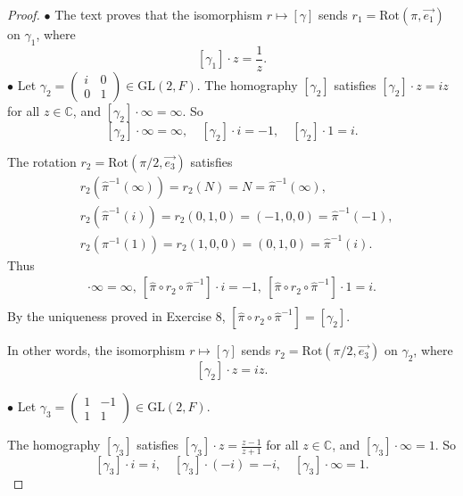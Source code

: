 \documentclass[11pt,a4paper]{article}
\newcommand{\C}{\mathbb{C}}
\begin{document}
\begin{proof}
$\bullet$ The text proves that the isomorphism $r\mapsto [\gamma]$ sends $r_1 = \mathrm{Rot}(\pi, \overrightarrow{e_1})$ on $\gamma_1$, where $$[\gamma_1]\cdot z = \frac{1}{z}.$$
$\bullet$ Let
$\gamma_2 =
\left(
\begin{array}{cc}
 i&   0   \\
 0&   1  
\end{array}
\right) 
\in \mathrm{GL}(2,F)
$. The homography $[\gamma_2]$ satisfies $[\gamma_2]\cdot z = iz$ for all $z\in \C$, and $[\gamma_2] \cdot \infty = \infty$. So $$[\gamma_2] \cdot \infty = \infty,\quad[\gamma_2]\cdot i = -1, \quad[\gamma_2]\cdot 1 = i.$$

The rotation $r_2 = \mathrm{Rot}(\pi/2, \overrightarrow{e_3})$ satisfies
\begin{align*}
&r_2(\hat{\pi}^{-1}(\infty))  = r_2(N) = N = \hat{\pi}^{-1}(\infty), \\
&r_2(\hat{\pi}^{-1}(i)) =r_2(0,1,0) = (-1,0,0) = \hat{\pi}^{-1}(-1),\\
 &r_2(\pi^{-1}(1))=r_2(1,0,0) = (0,1,0) = \hat{\pi}^{-1}(i).
 \end{align*} Thus
 \begin{align*}
 [\hat{\pi} \circ r_2 \circ \hat{\pi}^{-1}] \cdot \infty= \infty, \ [\hat{\pi} \circ r_2 \circ \hat{\pi}^{-1}]\cdot i = -1,\  [\hat{\pi} \circ r_2 \circ \hat{\pi}^{-1}]\cdot 1 = i.\\
 \end{align*}
By the uniqueness proved in Exercise 8, $[\hat{\pi} \circ r_2 \circ \hat{\pi}^{-1}]  = [\gamma_2]$.
 
In other words, the isomorphism $r\mapsto [\gamma]$ sends $r_2 = \mathrm{Rot}(\pi/2, \overrightarrow{e_3})$ on $\gamma_2 $, where $$[\gamma_2]\cdot z = iz.$$
 
 \bigskip 
 
 $\bullet$ Let
$\gamma_3 =
\left(
\begin{array}{cc}
 1&   -1   \\
 1&   1  
\end{array}
\right) 
\in \mathrm{GL}(2,F)
$. 

The homography $[\gamma_3]$ satisfies $[\gamma_3]\cdot z = \frac{z-1}{z+1}$ for all $z\in \C$, and  $[\gamma_3] \cdot \infty =1$. So 
$$[\gamma_3] \cdot i= i,\quad [\gamma_3]\cdot (-i) = -i,\quad  [\gamma_3]\cdot \infty = 1.$$


\end{proof}
\end{document}
